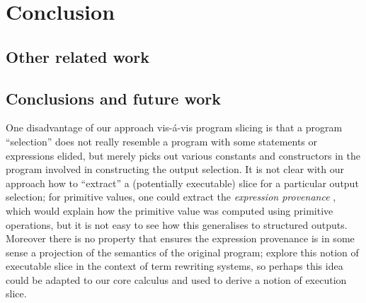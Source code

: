 \section{Conclusion}
\label{sec:conclusion}

\subsection{Other related work}

\subsection{Conclusions and future work}

One disadvantage of our approach vis-\'a-vis program slicing is that a program ``selection'' does not really resemble a program with some statements or expressions elided, but merely picks out various constants and constructors in the program involved in constructing the output selection. It is not clear with our approach how to ``extract'' a (potentially executable) slice for a particular output selection; for primitive values, one could extract the \emph{expression provenance} \cite{acar12}, which would explain how the primitive value was computed using primitive operations, but it is not easy to see how this generalises to structured outputs. Moreover there is no property that ensures the expression provenance is in some sense a projection of the semantics of the original program; \cite{field98} explore this notion of executable slice in the context of term rewriting systems, so perhaps this idea could be adapted to our core calculus and used to derive a notion of execution slice. 
